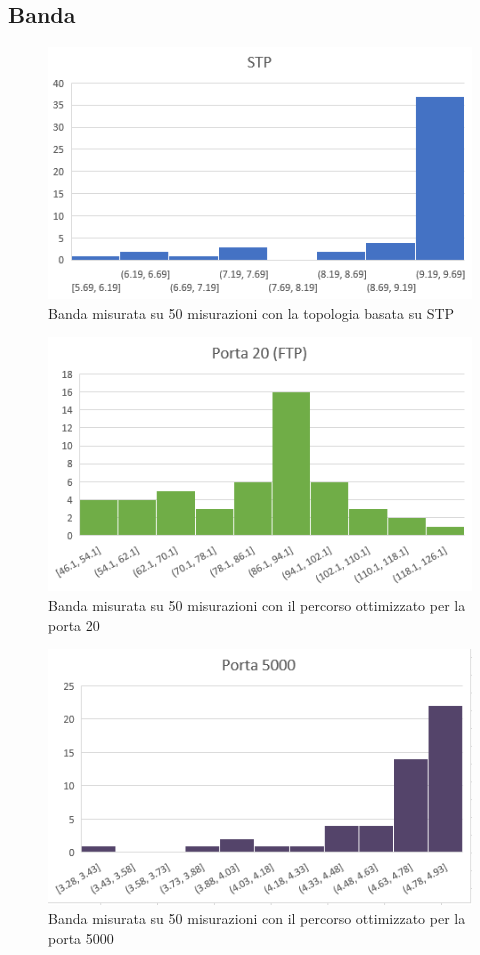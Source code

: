 \subsection{Banda}\label{ch:3.3.2}
\begin{figure}[H]
	\centering
	\includegraphics[width=1\linewidth]{../immagini/esempio/bw_stp}
	\caption[Banda STP]{Banda misurata su 50 misurazioni con la topologia basata su STP}
	\label{fig:bwstp}
\end{figure}
\begin{figure}[H]
	\centering
	\includegraphics[width=1\linewidth]{../immagini/esempio/bw_ftp}
	\caption[Banda Porta 20]{Banda misurata su 50 misurazioni con il percorso ottimizzato per la porta 20}
	\label{fig:bwftp}
\end{figure}
\begin{figure}[H]
	\centering
	\includegraphics[width=1\linewidth]{../immagini/esempio/bw_5000}
	\caption[Banda Porta 5000]{Banda misurata su 50 misurazioni con il percorso ottimizzato per la porta 5000}
	\label{fig:bw5000}
\end{figure}
